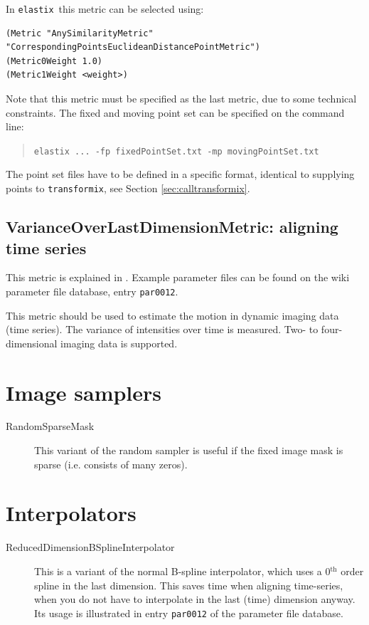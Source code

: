 \documentclass[]{report}
\newcommand{\elastix}{\texttt{elastix}}
\newcommand{\transformix}{\texttt{transformix}}
\begin{document}
In \elastix\ this metric can be selected using: \small
\begin{verbatim}
(Metric "AnySimilarityMetric" "CorrespondingPointsEuclideanDistancePointMetric")
(Metric0Weight 1.0)
(Metric1Weight <weight>)
\end{verbatim}
\normalsize Note that this metric must be specified as the last
metric, due to some technical constraints. The fixed and moving
point set can be specified on the command line:
\begin{quote}
\texttt{elastix ... -fp fixedPointSet.txt -mp movingPointSet.txt}
\end{quote}
The point set files have to be defined in a specific format,
identical to supplying points to \transformix, see Section
\ref{sec:calltransformix}.

\subsection{VarianceOverLastDimensionMetric: aligning time series}

This metric is explained in \cite{Metz10}. Example parameter files can be found
on the wiki parameter file database, entry \texttt{par0012}.

This metric should be used to estimate the motion in dynamic imaging data (time
series). The variance of intensities over time is measured. Two- to
four-dimensional imaging data is supported.

\section{Image samplers}

\begin{description}
\item[RandomSparseMask] This variant of the random sampler is useful if the
    fixed image mask is sparse (i.e. consists of many zeros).
\end{description}

\section{Interpolators}

\begin{description}
\item[ReducedDimensionBSplineInterpolator] This is a variant of the normal
    B-spline interpolator, which uses a 0$^\text{th}$ order spline in the
    last dimension. This saves time when aligning time-series, when you do
    not have to interpolate in the last (time) dimension anyway. Its usage
    is illustrated in entry \texttt{par0012} of the parameter file
    database.
\end{description}
\end{document}
